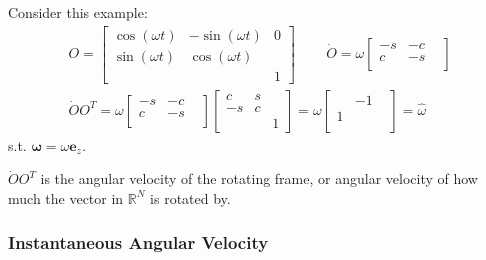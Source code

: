 \documentclass[10pt]{amsart}
\begin{document}
\begin{multicols*}{2}
Consider this example:
\begin{equation}
\begin{gathered}
O = \left[ \begin{matrix} \cos{(\omega t)} & - \sin{(\omega t)} & 0 \\
	\sin{(\omega t)} & \cos{(\omega t)} & \\
	& & 1 \end{matrix} \right] \quad \quad \, \dot{O} = \omega \left[ \begin{matrix} -s & -c & \\ 
	c & -s & \\
	& & \end{matrix} \right] \\
\dot{O} O^T = \omega \left[ \begin{matrix} -s & -c & \\ c & -s & \\ & & \end{matrix} \right] \left[ \begin{matrix} c & s & \\ -s & c & \\ & & 1 \end{matrix} \right] = \omega \left[ \begin{matrix} & -1 & \\ 1 & & \\ & & \end{matrix} \right] = \widehat{\omega} 
\end{gathered}
\end{equation}
s.t. $\mathbf{\omega} = \omega \mathbf{e}_z$.

$\dot{O} O^T$ is the angular velocity of the rotating frame, or angular velocity of how much the vector in $\mathbb{R}^N$ is rotated by.

\subsubsection{Instantaneous Angular Velocity}


\end{multicols*}
\end{document}
